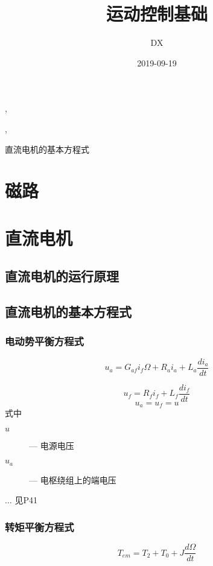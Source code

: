 \documentclass[11pt]{book}
\begin{document}
\title{运动控制基础},\author{DX},\date{2019-09-19}
\maketitle
\tableofcontents
\makeindex

直流电机的基本方程式

\chapter{磁路}

\chapter{直流电机}

\section{直流电机的运行原理}

\section{直流电机的基本方程式}%

\subsection{电动势平衡方程式}%
\label{sub:dian_dong_shi_ping_heng_fang_cheng_shi_}

\begin{equation}
	u_a = G_{af}i_f\Omega + R_ai_a + L_a \frac{di_a}{dt} 
\end{equation}

\begin{equation}
 u_f = R_fi_f + L_f \frac{di_f}{dt} 
\end{equation}
$$
	u_a = u_f = u
$$
式中
\begin{description}
	\item[$u$] --- 电源电压
	\item[$u_a$] --- 电枢绕组上的端电压
\end{description}
$\ldots$ 见P41

\subsection{转矩平衡方程式}%
\label{sub:zhuan_ju_ping_heng_fang_cheng_shi_}


$$
	T_{em} = T_2 + T_0 + J \frac{d\Omega}{dt} 
$$
\end{document}

